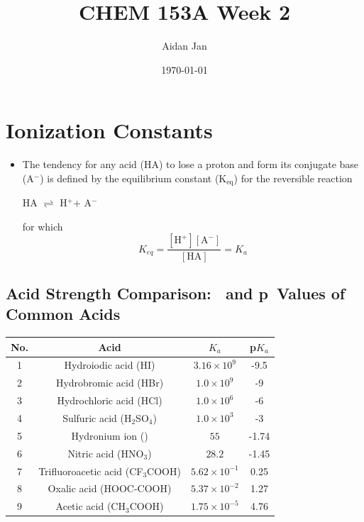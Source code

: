 \documentclass[10pt]{article}
\title{CHEM 153A Week 2}
\author{Aidan Jan}
\date{\today}
\newcommand{\hydronium}{\text{H$_3$O$^+$}}
\newcommand{\pc}{$^+$}
\newcommand{\nc}{$^-$}
\newcommand{\ka}{\text{$K_\text{a}$}}
\begin{document}
\maketitle

\section*{Ionization Constants}
\begin{itemize}
    \item The tendency for any acid (HA) to lose a proton and form its conjugate base (A\nc) is defined by the equilibrium constant (K$_{\text{eq}}$) for the reversible reaction
    \begin{center}
        HA $\rightleftharpoons$ H\pc + A\nc
    \end{center}
    for which 
    \[K_{eq} = \frac{[\text{H}^+][\text{A}^-]}{[\text{HA}]} = K_a\]
\end{itemize}
\subsection*{Acid Strength Comparison: \ka ~and p\ka ~Values of Common Acids}
\begin{center}
    \begin{tabular}{|c|c|c|c|}
        \hline
        No. & \textbf{Acid} & $K_a$ & p$K_a$ \\ \hline
        1 & Hydroiodic acid (HI) & $3.16\times 10^9$ & -9.5 \\ \hline
        2 & Hydrobromic acid (HBr) & $1.0\times 10^9$ & -9 \\ \hline
        3 & Hydrochloric acid (HCl) & $1.0\times 10^6$ & -6 \\ \hline
        4 & Sulfuric acid (H$_2$SO$_4$) & $1.0\times 10^3$ & -3 \\ \hline
        5 & Hydronium ion (\hydronium) & $55$ & -1.74 \\ \hline
        6 & Nitric acid (HNO$_3$) & $28.2$ & -1.45 \\ \hline
        7 & Trifluoroacetic acid (CF$_3$COOH) & $5.62\times 10^{-1}$ & 0.25 \\ \hline
        8 & Oxalic acid (HOOC-COOH) & $5.37\times 10^{-2}$ & 1.27 \\ \hline
        9 & Acetic acid (CH$_3$COOH) & $1.75\times 10^{-5}$ & 4.76 \\ \hline
        \end{tabular}
\end{center}
\end{document}
